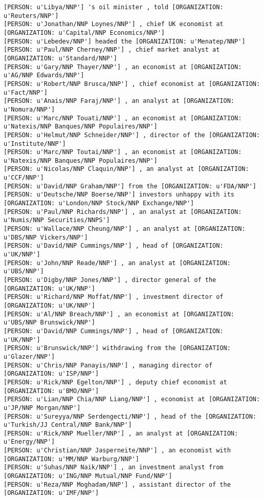 \documentclass[12pt]{report}
\begin{document}
\begin{scriptsize}
\begin{verbatim}
[PERSON: u'Libya/NNP'] 's oil minister , told [ORGANIZATION: u'Reuters/NNP']
[PERSON: u'Jonathan/NNP Loynes/NNP'] , chief UK economist at [ORGANIZATION: u'Capital/NNP Economics/NNP']
[PERSON: u'Lebedev/NNP'] headed the [ORGANIZATION: u'Menatep/NNP']
[PERSON: u'Paul/NNP Cherney/NNP'] , chief market analyst at [ORGANIZATION: u'Standard/NNP']
[PERSON: u'Gary/NNP Thayer/NNP'] , an economist at [ORGANIZATION: u'AG/NNP Edwards/NNP']
[PERSON: u'Robert/NNP Brusca/NNP'] , chief economist at [ORGANIZATION: u'Fact/NNP']
[PERSON: u'Anais/NNP Faraj/NNP'] , an analyst at [ORGANIZATION: u'Nomura/NNP']
[PERSON: u'Marc/NNP Touati/NNP'] , an economist at [ORGANIZATION: u'Natexis/NNP Banques/NNP Populaires/NNP']
[PERSON: u'Helmut/NNP Schneider/NNP'] , director of the [ORGANIZATION: u'Institute/NNP']
[PERSON: u'Marc/NNP Toutai/NNP'] , an economist at [ORGANIZATION: u'Natexis/NNP Banques/NNP Populaires/NNP']
[PERSON: u'Nicolas/NNP Claquin/NNP'] , an analyst at [ORGANIZATION: u'CCF/NNP']
[PERSON: u'David/NNP Graham/NNP'] from the [ORGANIZATION: u'FDA/NNP']
[PERSON: u'Deutsche/NNP Boerse/NNP'] investors unhappy with its [ORGANIZATION: u'London/NNP Stock/NNP Exchange/NNP']
[PERSON: u'Paul/NNP Richards/NNP'] , an analyst at [ORGANIZATION: u'Numis/NNP Securities/NNPS']
[PERSON: u'Wallace/NNP Cheung/NNP'] , an analyst at [ORGANIZATION: u'DBS/NNP Vickers/NNP']
[PERSON: u'David/NNP Cummings/NNP'] , head of [ORGANIZATION: u'UK/NNP']
[PERSON: u'John/NNP Reade/NNP'] , an analyst at [ORGANIZATION: u'UBS/NNP']
[PERSON: u'Digby/NNP Jones/NNP'] , director general of the [ORGANIZATION: u'UK/NNP']
[PERSON: u'Richard/NNP Moffat/NNP'] , investment director of [ORGANIZATION: u'UK/NNP']
[PERSON: u'Al/NNP Breach/NNP'] , an economist at [ORGANIZATION: u'UBS/NNP Brunswick/NNP']
[PERSON: u'David/NNP Cummings/NNP'] , head of [ORGANIZATION: u'UK/NNP']
[PERSON: u'Brunswick/NNP'] withdrawing from the [ORGANIZATION: u'Glazer/NNP']
[PERSON: u'Chris/NNP Panayis/NNP'] , managing director of [ORGANIZATION: u'ISP/NNP']
[PERSON: u'Rick/NNP Egelton/NNP'] , deputy chief economist at [ORGANIZATION: u'BMO/NNP']
[PERSON: u'Lian/NNP Chia/NNP Liang/NNP'] , economist at [ORGANIZATION: u'JP/NNP Morgan/NNP']
[PERSON: u'Sureyya/NNP Serdengecti/NNP'] , head of the [ORGANIZATION: u'Turkish/JJ Central/NNP Bank/NNP']
[PERSON: u'Rick/NNP Mueller/NNP'] , an analyst at [ORGANIZATION: u'Energy/NNP']
[PERSON: u'Christian/NNP Jasperneite/NNP'] , an economist with [ORGANIZATION: u'MM/NNP Warburg/NNP']
[PERSON: u'Suhas/NNP Naik/NNP'] , an investment analyst from [ORGANIZATION: u'ING/NNP Mutual/NNP Fund/NNP']
[PERSON: u'Reza/NNP Moghadam/NNP'] , assistant director of the [ORGANIZATION: u'IMF/NNP']

\end{verbatim}
\end{scriptsize}
\end{document}
